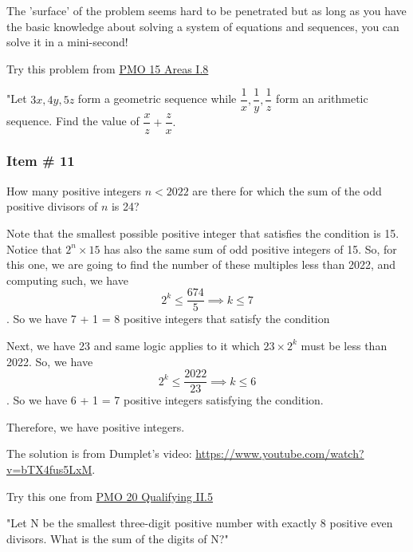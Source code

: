 \documentclass[11pt,paper=letter]{scrartcl}
\begin{document}
\begin{mdframed}

\begin{rem}
The 'surface' of the problem seems hard to be penetrated but as long as you have the basic knowledge about solving a system of equations and sequences, you can solve it in a mini-second!
\end{rem}


\begin{rem}
Try this problem from \href{http://pmo.ph/wp-content/uploads/2020/12/15th-PMO-Qualifying-Area-Stage.pdf}{PMO 15 Areas I.8}

"Let $3x, 4y, 5z$ form a geometric sequence while $\dfrac{1}{x},\dfrac{1}{y}, \dfrac{1}{z} $ form an arithmetic
sequence. Find the value of $\dfrac{x}{z} + \dfrac{z}{x}.$
\end{rem}
\end{mdframed}

\subsubsection{Item \# 11}

\begin{probboxed}
\item How many positive integers $n<2022$ are there for which the sum of the odd positive divisors of $n$ is 24?

\end{probboxed}


\sol

Note that the smallest possible positive integer that satisfies the condition is 15. Notice that $2^n \times 15$ has also the same sum of odd positive integers of 15. So, for this one, we are going to find the number of these multiples less than 2022, and computing such, we have $$2^k \leq \dfrac{674}{5} \implies k \leq 7$$. So we have 7 + 1 = 8 positive integers that satisfy the condition

Next, we have 23 and same logic applies to it which $23 \times 2^k$ must be less than 2022. So, we have $$2^k \leq \dfrac{2022}{23} \implies k \leq 6$$. So we have 6 + 1 = 7 positive integers satisfying the condition.

Therefore, we have  positive integers.

\begin{mdframed}
\begin{rem}
The solution is from Dumplet's video: \url{https://www.youtube.com/watch?v=bTX4fus5LxM}.
\end{rem}

\begin{rem}
Try this one from \href{http://pmo.ph/wp-content/uploads/2018/08/PMO-20-Qualifying-Round-with-answers-only.pdf}{PMO 20 Qualifying II.5}

"Let N be the smallest three-digit positive number with exactly 8 positive even divisors. What is the sum of the digits of N?"
\end{rem}
\end{mdframed}
\end{document}
